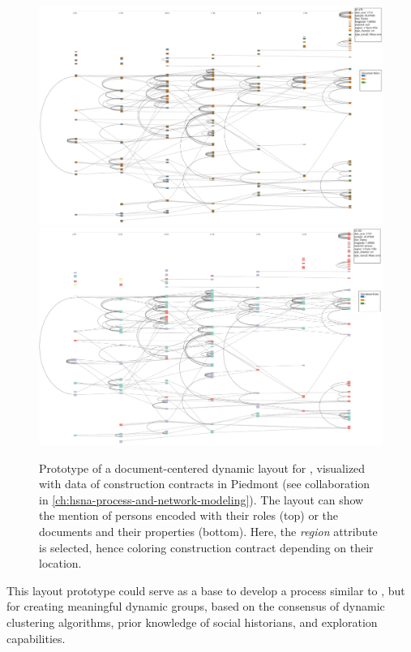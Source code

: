 \begin{figure}
    \centering
    \includegraphics[width=\textwidth]{static/figures/conclusion/dyn2}
    \includegraphics[width=\textwidth]{static/figures/conclusion/dyn2_region}
    \caption{Prototype of a document-centered dynamic layout for \modelplural, visualized with data of construction contracts in Piedmont (see collaboration \pascal in \autoref{ch:hsna-process-and-network-modeling}). The layout can show the mention of persons encoded with their roles (top) or the documents and their properties (bottom). Here, the \emph{region} attribute is selected, hence coloring construction contract depending on their location.}
\label{fig:conclu-dynLayout}
\end{figure}

This layout prototype could serve as a base to develop a process similar to \pkclustering, but for creating meaningful dynamic groups, based on the consensus of dynamic clustering algorithms, prior knowledge of social historians, and exploration capabilities.



